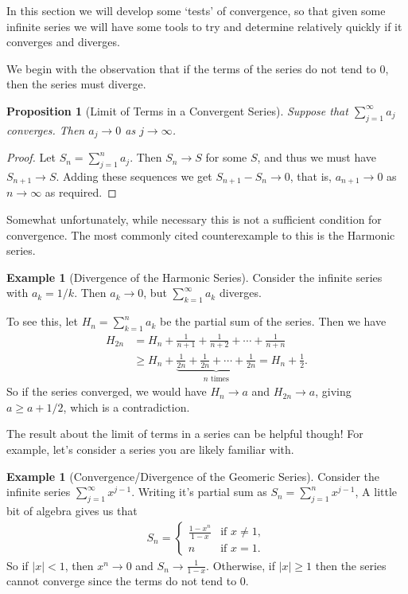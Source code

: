 \documentclass[11pt, a4paper]{article}
\newtheorem{proposition}[theorem]{Proposition}
\theoremstyle{definition}
\newtheorem{example}[theorem]{Example}
\begin{document}
In this section we will develop some `tests' of convergence, so that given some infinite series we will have some tools to try and determine relatively quickly if it converges and diverges.

We begin with the observation that if the terms of the series do not tend to 0, then the series must diverge.

\begin{proposition}[Limit of Terms in a Convergent Series]\label{prop:limit-of-terms}
	Suppose that $\sum_{j = 1}^{\infty} a_j$ converges. Then $a_j \rightarrow 0$ as $j \rightarrow \infty$.
\end{proposition}
\begin{proof}
	Let $S_n = \sum_{j = 1}^{n} a_j$. Then $S_n \rightarrow S$ for some $S$, and thus we must have $S_{n + 1} \rightarrow S$. Adding these sequences we get $S_{n+1} - S_{n} \rightarrow 0$, that is, $a_{n + 1} \rightarrow 0$ as $n \rightarrow \infty$ as required.
\end{proof}

Somewhat unfortunately, while necessary this is not a sufficient condition for convergence. The most commonly cited counterexample to this is the Harmonic series.

\begin{example}[Divergence of the Harmonic Series]
	Consider the infinite series with $a_k = 1/k$. Then $a_k \rightarrow 0$, but $\sum_{k = 1}^\infty a_k$ diverges.

	To see this, let $H_n = \sum_{k = 1}^n a_k$ be the partial sum of the series. Then we have
	\begin{align*}
		H_{2n} &= H_n + \frac{1}{n + 1} + \frac{1}{n + 2} + \cdots + \frac{1}{n + n} \\
		&\geq  H_n + \underbrace{\frac{1}{2n} + \frac{1}{2n} + \cdots + \frac{1}{2n}}_{\text{$n$ times}} = H_n + \frac{1}{2}.
	\end{align*}
	So if the series converged, we would have $H_n \rightarrow a$ and $H_{2n} \rightarrow a$, giving $a \geq a + 1/2$, which is a contradiction.
\end{example}

The result about the limit of terms in a series can be helpful though! For example, let's consider a series you are likely familiar with.

\begin{example}[Convergence/Divergence of the Geomeric Series]
		Consider the infinite series $\sum_{j = 1}^{\infty} x^{j - 1}$. Writing it's partial sum as
	$S_n = \sum_{j = 1}^{n} x^{j-1}$,
	A little bit of algebra gives us that
	\begin{align*}
		S_n = \begin{cases}
        \frac{1 - x^n}{1 - x} &\mbox{if } x \neq 1, \\
        n &\mbox{if } x = 1.
       \end{cases}
	\end{align*}
	So if $|x| < 1$, then $x^n \rightarrow 0$ and $S_n \rightarrow \frac{1}{1 - x}$. Otherwise, if $|x| \geq 1$ then the series cannot converge since the terms do not tend to 0.
\end{example}
\end{document}
